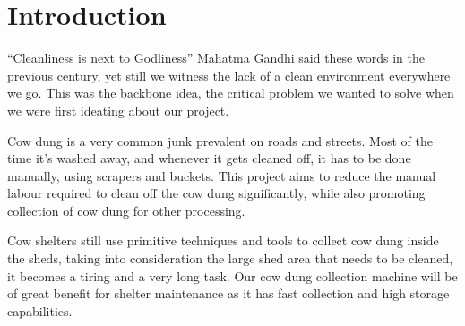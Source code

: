 \chapter{Introduction} \label{Introduction}
\tab
\tab “Cleanliness is next to Godliness”
Mahatma Gandhi said these words in the previous century, yet still we witness the lack of a clean environment everywhere we go. This was the backbone idea, the critical problem we wanted to solve when we were first ideating about our project. 

\tab Cow dung is a very common junk prevalent on roads and streets. Most of the time it’s washed away, and whenever it gets cleaned off, it has to be done manually, using scrapers and buckets. This project aims to reduce the manual labour required to clean off the cow dung significantly, while also promoting collection of cow dung for other processing.

\tab Cow shelters still use primitive techniques and tools to collect cow dung inside the sheds, taking into consideration the large shed area that needs to be cleaned, it becomes a tiring and a very long task. Our cow dung collection machine will be of great benefit for shelter maintenance as it has fast collection and high storage capabilities.


\pagebreak